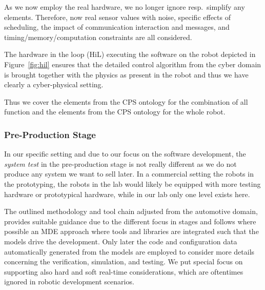 As we now employ the real hardware, we no longer ignore resp.~simplify any elements. Therefore, now real sensor values with noise, specific effects of scheduling, the impact of communication interaction and messages, and timing/memory/computation constraints are all considered.

%
The hardware in the loop (HiL) executing the software on the robot depicted in Figure~\ref{fig:hil} ensures that the detailed control algorithm from the cyber domain is brought together with the physics as present in the robot and thus we have clearly a cyber-physical setting. 

Thus we cover the elements \CPSCyberPart from the CPS ontology for the combination of all function and the elements \CPSPhysicalPart from the CPS ontology for the whole robot.




\subsubsection{Pre-Production Stage}
%
In our specific setting and due to our focus on the software development, the \emph{system test} in the pre-production stage is not really different as we do not produce any system we want to sell later. In a commercial setting the robots in the prototyping, the robots in the lab would likely be equipped with more testing hardware or prototypical hardware, while in our lab only one level exists here.

The outlined methodology and tool chain adjusted from the automotive domain, provides suitable guidance due to the different focus in stages and follows where possible an MDE approach where tools and libraries are integrated such that the models drive the development. Only later the code and configuration data automatically generated from the models are employed to consider more details concerning the verification, simulation, and testing.
%
We put special focus on supporting also hard and soft real-time considerations, which are oftentimes ignored in robotic development scenarios.










